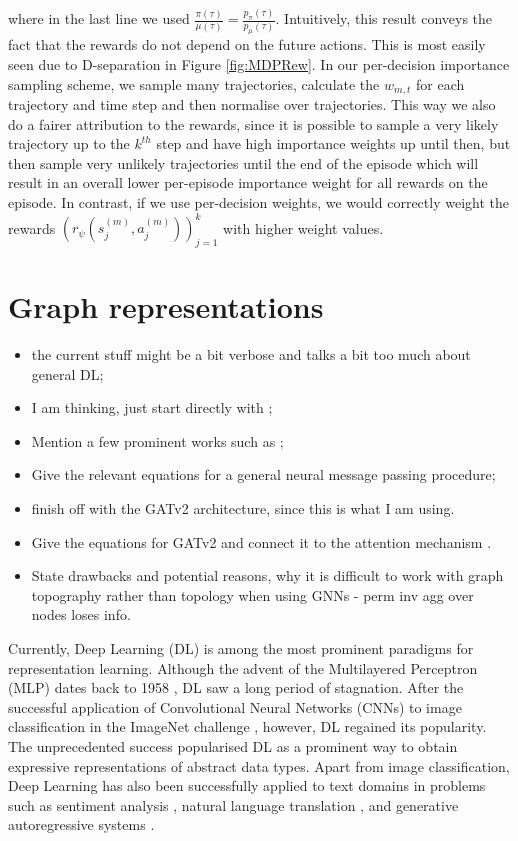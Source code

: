 \documentclass{report}
\numberwithin{equation}{section}
\numberwithin{figure}{section}
\numberwithin{table}{section}
\numberwithin{algorithm}{section}
\begin{document}
where in the last line we used $\frac{\pi(\tau)}{\mu(\tau)}=\frac{p_\pi(\tau)}{p_\mu(\tau)}$.
Intuitively, this result conveys the fact that the rewards 
do not depend on the future actions. This is most easily 
seen due to D-separation in Figure \ref{fig:MDPRew}.
In our per-decision importance sampling scheme, we sample 
many trajectories, calculate the $w_{m,t}$ for each 
trajectory and time step and then normalise over trajectories.
This way we also do a fairer attribution to the rewards, since 
it is possible to sample a very likely trajectory up to 
the $k^{th}$ step and have high importance weights up until then, 
but then sample very unlikely trajectories until the end of the episode 
which will result in an overall lower 
per-episode importance weight for all rewards on the episode. 
In contrast, if we use per-decision weights, we would 
correctly weight the rewards 
$\left(r_\psi(s_j^{(m)}, a_j^{(m)})\right)_{j=1}^k$ 
with higher weight values. 


\section{Graph representations}\label{sec:GNNs}
\begin{itemize}
  \item the current stuff might be a bit verbose and talks 
  a bit too much about general DL; 
  \item I am thinking, just start directly with \cite{ScarselliGNN};
  \item Mention a few prominent works such as \cite{MPNNs,GCN};
  \item Give the relevant equations for a general neural message 
  passing procedure;
  \item finish off with the GATv2 \citep{GATv2} architecture, 
  since this is what I am using.
  \item Give the equations for GATv2 and connect it to the 
  attention mechanism \citep{transformers}.
  \item State drawbacks and potential reasons, why it is difficult 
    to work with graph topography rather than topology when using 
    GNNs - perm inv agg over nodes loses info.
\end{itemize}
Currently, Deep Learning (DL) is among the most prominent paradigms 
for representation learning. Although the advent of the 
Multilayered Perceptron (MLP) dates back to 
1958 \citep{perceptron}, DL saw a long period 
of stagnation. After the successful application of 
Convolutional Neural 
Networks (CNNs) \citep{CNNsLecun} to image classification
in the ImageNet challenge 
\citep{alexnet,imagenet}, however, DL regained 
its popularity. The unprecedented success 
popularised DL as a prominent way 
to obtain expressive representations of abstract data types. 
Apart from image classification, 
Deep Learning has also been successfully 
applied to text domains in problems such as 
sentiment analysis \citep{SentimentRNN,textCNN,BERT},  
natural language translation \citep{nlpTranslation},
and generative autoregressive systems \citep{GPT,GPT2020}.
\end{document}
